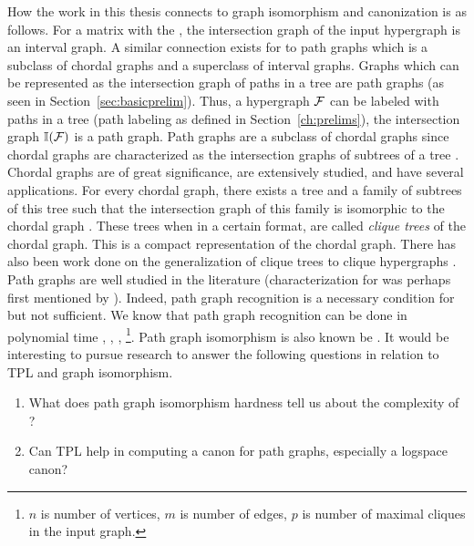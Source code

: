 How the work in this thesis connects to graph isomorphism and
canonization is as follows. For a matrix with the \COP, the
intersection graph of the input hypergraph is an interval graph.  A
similar connection exists for \TPL to path graphs which is a subclass
of chordal graphs and a superclass of interval graphs. Graphs which
can be represented as the intersection graph of paths in a tree are
path graphs (as seen in Section~\ref{sec:basicprelim}).  %
Thus, a hypergraph ${\cal F}$ can be labeled with paths in a tree (path
labeling as defined in Section~\ref{ch:prelims}), \iff the
intersection graph $\mathbb I({\cal F})$ is a path graph. Path graphs are a
subclass of chordal graphs since chordal graphs are characterized as
the intersection graphs of subtrees of a tree \cite[Ch.~4,
Sec.~5]{mcg04}. Chordal graphs are of great significance, are
extensively studied, and have several applications. For every chordal
graph, there exists a tree and a family of subtrees of this tree such
that the intersection graph of this family is isomorphic to the
chordal graph \cite{jrw72phd,gav74b,bun74}.  These trees when in a
certain format, are called {\em clique trees} \cite{ppy92} of the
chordal graph. This is a compact representation of the chordal
graph. There has also been work done on the generalization of clique
trees to clique hypergraphs \cite{km02}.  Path graphs are well studied
in the literature (characterization for \uvgraphs was perhaps first
mentioned by \cite{plr70}).
Indeed, path graph recognition is a necessary condition for \CFTPL but
not sufficient.  We know that path graph recognition can be done in
polynomial time \cite[first algorithm.
$O\left(pn^3\right)$]{gav78},\cite[$O\left(p(m+n)\right)$]{aas93}
\cite{sb94}, \cite[linear algorithm]{db95}, \cite[PR-trees]{cha11}
\footnote{$n$ is number of vertices, $m$ is number of edges, $p$ is
  number of maximal cliques in the input graph.}.  Path graph
isomorphism is also known be \gicomplete \cite{bpt96}.  It would be
interesting to pursue research to answer the following questions in
relation to TPL and graph isomorphism.
\begin{enumerate}
\item What does path graph isomorphism hardness tell us about the
  complexity of \CFTPL?
\item Can TPL help in computing a canon for path graphs, especially a
  logspace canon?
\end{enumerate}


